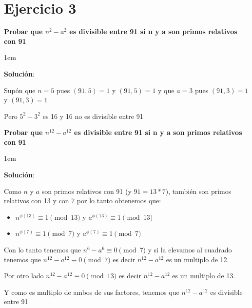 \documentclass[12pt, fleqn]{article}                             %
\newenvironment{SmallIndentation}[1][0.75em]                    %
    {\begin{adjustwidth}{#1}{}\begin{footnotesize}}                 %
    {\end{footnotesize}\end{adjustwidth}}                           %
\begin{document}
\section{Ejercicio 3}

    \textbf{Probar que $n^2 - a^2$ es divisible entre 91 si n y a son primos relativos con 91}

    \begin{SmallIndentation}[1em]
        \textbf{Solución}:
        
        Supón que $n = 5$ pues $(91, 5) = 1$ y $(91, 5) = 1$
        y que $a = 3$ pues $(91, 3) = 1$ y $(91, 3) = 1$

        Pero $5^2- 3^2$ es 16 y 16 no es divisible entre 91 
    
    \end{SmallIndentation}

    \clearpage


    \textbf{Probar que $n^{12} - a^{12}$ es divisible entre 91 si n y a son primos relativos con 91}

    \begin{SmallIndentation}[1em]
        \textbf{Solución}:
        
        Como $n$ y $a$ son primos relativos con 91 (y $91 = 13*7$), también son primos relativos con 13 y con 7
        por lo tanto obtenemos que:
        \begin{itemize}
            \item $n^{\phi(13)} \equiv 1 \pmod{13}$ y $a^{\phi(13)} \equiv 1 \pmod{13}$
            \item $n^{\phi(7)} \equiv 1 \pmod{7}$ y $a^{\phi(7)} \equiv 1 \pmod{7}$
        \end{itemize}

        Con lo tanto tenemos que $n^{6} - a^{6} \equiv 0 \pmod{7}$ y si la elevamos al cuadrado tenemos
        que $n^{12} - a^{12} \equiv 0 \pmod{7}$ es decir $n^{12} - a^{12}$ es un multiplo de 12.

        Por otro lado $n^{12} - a^{12} \equiv 0 \pmod{13}$ es decir $n^{12} - a^{12}$ es un multiplo de 13.

        Y como es multiplo de ambos de sus factores, tenemos que $n^{12} - a^{12}$ es divisible entre 91
    
    \end{SmallIndentation}
        
\end{document}
